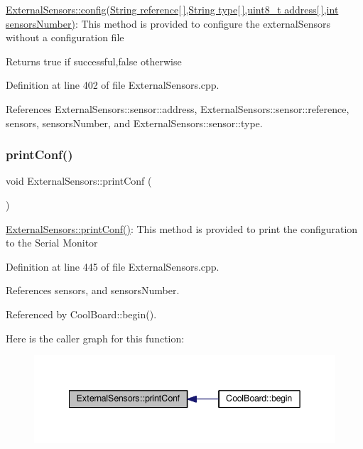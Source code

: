 \hyperlink{class_external_sensors_ac829858f587e15a3fcb00567248f0edd}{External\+Sensors\+::config(\+String reference\mbox{[}$\,$\mbox{]},\+String type\mbox{[}$\,$\mbox{]},uint8\+\_\+t address\mbox{[}$\,$\mbox{]},int sensors\+Number)}\+: This method is provided to configure the external\+Sensors without a configuration file

\begin{DoxyReturn}{Returns}
true if successful,false otherwise 
\end{DoxyReturn}


Definition at line 402 of file External\+Sensors.\+cpp.



References External\+Sensors\+::sensor\+::address, External\+Sensors\+::sensor\+::reference, sensors, sensors\+Number, and External\+Sensors\+::sensor\+::type.

\mbox{\label{class_external_sensors_a78c2bf55084435dd51d3c559b2d3c6f3}} 
\subsubsection{\texorpdfstring{print\+Conf()}{printConf()}}
{\footnotesize\ttfamily void External\+Sensors\+::print\+Conf (\begin{DoxyParamCaption}{ }\end{DoxyParamCaption})}

\hyperlink{class_external_sensors_a78c2bf55084435dd51d3c559b2d3c6f3}{External\+Sensors\+::print\+Conf()}\+: This method is provided to print the configuration to the Serial Monitor 

Definition at line 445 of file External\+Sensors.\+cpp.



References sensors, and sensors\+Number.



Referenced by Cool\+Board\+::begin().

Here is the caller graph for this function\+:\nopagebreak
\begin{figure}[H]
\begin{center}
\leavevmode
\includegraphics[width=342pt]{d1/d2f/class_external_sensors_a78c2bf55084435dd51d3c559b2d3c6f3_icgraph}
\end{center}
\end{figure}


